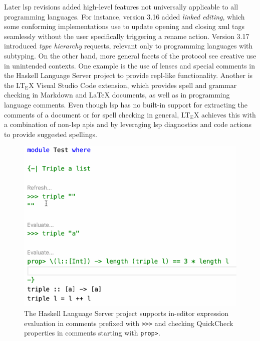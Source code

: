 Later \acrshort{lsp} revisions added high-level features not universally
applicable to all programming languages. For instance, version 3.16 added
\emph{linked editing}, which some conforming implementations use to update
opening and closing \acrshort{xml} tags seamlessly without the user specifically
triggering a rename action. Version 3.17 introduced \emph{type hierarchy}
requests, relevant only to programming languages with subtyping. On the other
hand, more general facets of the protocol see creative use in unintended
contexts. One example is the use of lenses and special comments in the Haskell
Language Server project\cite{haskell_ls} to provide \acrshort{repl}-like
functionality. Another is the LT$_\text{E}$X Visual Studio Code
extension\cite{vscode_spellcheck}, which provides spell and grammar checking in
Markdown and \LaTeX{} documents, as well as in programming language comments.
Even though \acrshort{lsp} has no built-in support for extracting the comments
of a document or for spell checking in general, LT$_\text{E}$X achieves this
with a combination of non-\acrshort{lsp} \acrshort{api}s and by leveraging
\acrshort{lsp} diagnostics and code actions to provide suggested spellings.

\begin{figure}[h]\centering
	\includegraphics[height=0.3\textheight]{resources/code_haskell_repl.png}
	\caption{The Haskell Language Server project supports in-editor expression
	evaluation in comments prefixed with \texttt{>>>} and checking QuickCheck
	properties in comments starting with \texttt{prop>}.}
\end{figure}

